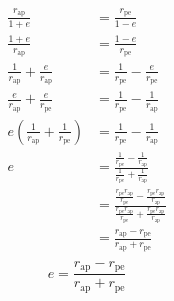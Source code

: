 \documentclass[../main.tex]{subfiles}
\begin{document}
\begin{align*}
    \frac{r_\text{ap}}{1+e}                                   & =\frac{r_\text{pe}}{1-e}                                                                                                                                                             \\
    \frac{1+e}{r_\text{ap}}                                   & =\frac{1-e}{r_\text{pe}}                                                                                                                                                             \\
    \frac{1}{r_\text{ap}}+\frac{e}{r_\text{ap}}               & =\frac{1}{r_\text{pe}}-\frac{e}{r_\text{pe}}                                                                                                                                         \\
    \frac{e}{r_\text{ap}}+\frac{e}{r_\text{pe}}               & =\frac{1}{r_\text{pe}}-\frac{1}{r_\text{ap}}                                                                                                                                         \\
    e\left(\frac{1}{r_\text{ap}}+\frac{1}{r_\text{pe}}\right) & =\frac{1}{r_\text{pe}}-\frac{1}{r_\text{ap}}                                                                                                                                         \\
    e                                                         & =\frac{\frac{1}{r_\text{pe}}-\frac{1}{r_\text{ap}}}{\frac{1}{r_\text{pe}}+\frac{1}{r_\text{ap}}}                                                                                     \\
                                                              & =\frac{\frac{r_\text{pe}r_\text{ap}}{r_\text{pe}}-\frac{r_\text{pe}r_\text{ap}}{r_\text{ap}}}{\frac{r_\text{pe}r_\text{ap}}{r_\text{pe}}+\frac{r_\text{pe}r_\text{ap}}{r_\text{ap}}} \\
                                                              & =\frac{r_\text{ap}-r_\text{pe}}{r_\text{ap}+r_\text{pe}}                                                                                                                             \\
\end{align*}
\begin{equation}\label{Accentricity in terms of apses}
    e=\frac{r_\text{ap}-r_\text{pe}}{r_\text{ap}+r_\text{pe}}
\end{equation}
\end{document}
